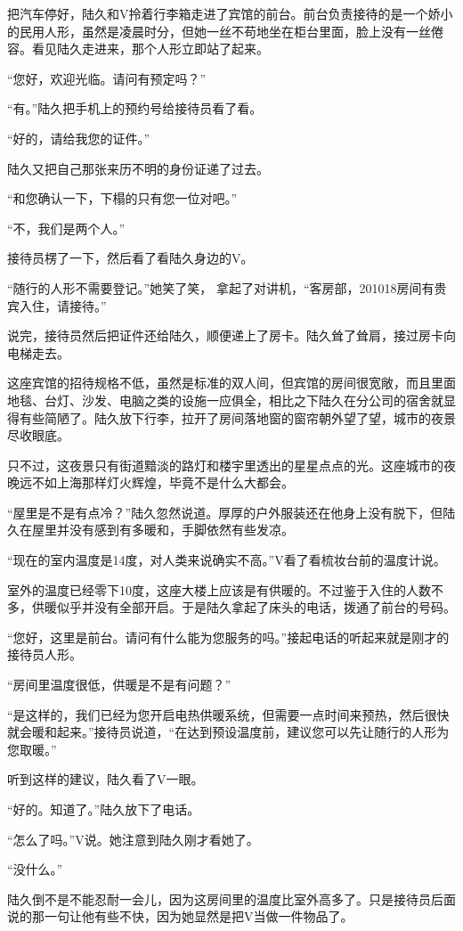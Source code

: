 把汽车停好，陆久和V拎着行李箱走进了宾馆的前台。前台负责接待的是一个娇小的民用人形，虽然是凌晨时分，但她一丝不苟地坐在柜台里面，脸上没有一丝倦容。看见陆久走进来，那个人形立即站了起来。

“您好，欢迎光临。请问有预定吗？”

“有。”陆久把手机上的预约号给接待员看了看。

“好的，请给我您的证件。”

陆久又把自己那张来历不明的身份证递了过去。

“和您确认一下，下榻的只有您一位对吧。”

“不，我们是两个人。”

接待员楞了一下，然后看了看陆久身边的V。

“随行的人形不需要登记。”她笑了笑， 拿起了对讲机，“客房部，201018房间有贵宾入住，请接待。”

说完，接待员然后把证件还给陆久，顺便递上了房卡。陆久耸了耸肩，接过房卡向电梯走去。

这座宾馆的招待规格不低，虽然是标准的双人间，但宾馆的房间很宽敞，而且里面地毯、台灯、沙发、电脑之类的设施一应俱全，相比之下陆久在分公司的宿舍就显得有些简陋了。陆久放下行李，拉开了房间落地窗的窗帘朝外望了望，城市的夜景尽收眼底。

只不过，这夜景只有街道黯淡的路灯和楼宇里透出的星星点点的光。这座城市的夜晚远不如上海那样灯火辉煌，毕竟不是什么大都会。

“屋里是不是有点冷？”陆久忽然说道。厚厚的户外服装还在他身上没有脱下，但陆久在屋里并没有感到有多暖和，手脚依然有些发凉。

“现在的室内温度是14度，对人类来说确实不高。”V看了看梳妆台前的温度计说。

室外的温度已经零下10度，这座大楼上应该是有供暖的。不过鉴于入住的人数不多，供暖似乎并没有全部开启。于是陆久拿起了床头的电话，拨通了前台的号码。

“您好，这里是前台。请问有什么能为您服务的吗。”接起电话的听起来就是刚才的接待员人形。

“房间里温度很低，供暖是不是有问题？”

“是这样的，我们已经为您开启电热供暖系统，但需要一点时间来预热，然后很快就会暖和起来。”接待员说道，“在达到预设温度前，建议您可以先让随行的人形为您取暖。”

听到这样的建议，陆久看了V一眼。

“好的。知道了。”陆久放下了电话。

“怎么了吗。”V说。她注意到陆久刚才看她了。

“没什么。”

陆久倒不是不能忍耐一会儿，因为这房间里的温度比室外高多了。只是接待员后面说的那一句让他有些不快，因为她显然是把V当做一件物品了。

